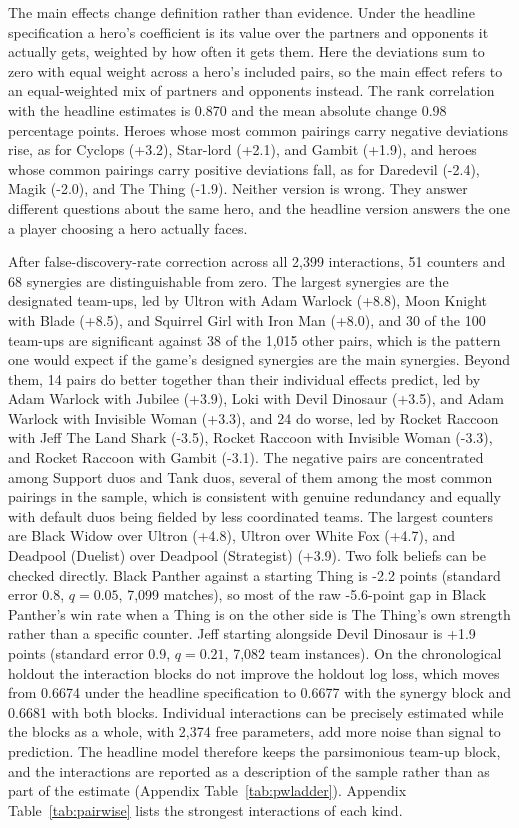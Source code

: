 \documentclass[11pt]{article}
\begin{document}
The main effects change definition rather than evidence. Under the headline specification a
hero's coefficient is its value over the partners and opponents it actually gets, weighted by
how often it gets them. Here the deviations sum to zero with equal weight across a hero's
included pairs, so the main effect refers to an equal-weighted mix of partners and opponents
instead. The rank correlation with the headline estimates is 0.870 and the mean
absolute change 0.98 percentage points. Heroes whose most common pairings carry
negative deviations rise, as for Cyclops (+3.2), Star-lord (+2.1), and Gambit (+1.9), and heroes whose common pairings carry
positive deviations fall, as for Daredevil (-2.4), Magik (-2.0), and The Thing (-1.9). Neither version is wrong. They answer
different questions about the same hero, and the headline version answers the one a player
choosing a hero actually faces.

After false-discovery-rate correction across all 2,399 interactions, 51
counters and 68 synergies are distinguishable from zero. The largest synergies are
the designated team-ups, led by Ultron with Adam Warlock (+8.8), Moon Knight with Blade (+8.5), and Squirrel Girl with Iron Man (+8.0), and 30 of the 100
team-ups are significant against 38 of the 1,015 other pairs,
which is the pattern one would expect if the game's designed synergies are the main synergies.
Beyond them, 14 pairs do better together than their individual effects predict, led by
Adam Warlock with Jubilee (+3.9), Loki with Devil Dinosaur (+3.5), and Adam Warlock with Invisible Woman (+3.3), and 24 do worse, led by Rocket Raccoon with Jeff The Land Shark (-3.5), Rocket Raccoon with Invisible Woman (-3.3), and Rocket Raccoon with Gambit (-3.1). The negative pairs are
concentrated among Support duos and Tank duos, several of them among the most common pairings in
the sample, which is consistent with genuine redundancy and equally with default duos being
fielded by less coordinated teams. The largest counters are Black Widow over Ultron (+4.8), Ultron over White Fox (+4.7), and Deadpool (Duelist) over Deadpool (Strategist) (+3.9). Two folk beliefs can be checked directly. Black Panther against a
starting Thing is -2.2 points (standard error 0.8, $q=0.05$, 7,099 matches), so most of the raw -5.6-point gap in Black Panther's
win rate when a Thing is on the other side is The Thing's own strength rather than a specific
counter. Jeff starting alongside Devil Dinosaur is +1.9 points (standard error 0.9, $q=0.21$, 7,082 team instances). On the chronological holdout
the interaction blocks do not improve the holdout log loss, which moves from 0.6674 under the headline specification to 0.6677 with the synergy block and 0.6681 with both blocks. Individual interactions can be precisely estimated while the blocks as a whole, with 2,374 free parameters, add more noise than signal to prediction. The headline model therefore keeps the parsimonious team-up block, and the interactions are reported as a description of the sample rather than as part of the estimate (Appendix Table~\ref{tab:pwladder}). Appendix
Table~\ref{tab:pairwise} lists the strongest interactions of each kind.
\end{document}
